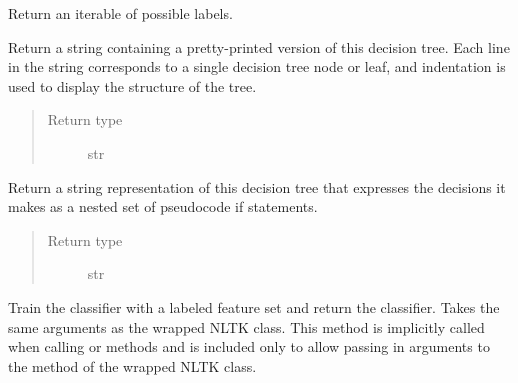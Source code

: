 \documentclass[letterpaper,10pt,english]{sphinxmanual}
\begin{document}
\begin{fulllineitems}
\begin{fulllineitems}
\label{api_reference:textblob.classifiers.DecisionTreeClassifier.labels}
Return an iterable of possible labels.

\end{fulllineitems}


\begin{fulllineitems}
\label{api_reference:textblob.classifiers.DecisionTreeClassifier.pprint}
Return a string containing a pretty-printed version of this decision
tree. Each line in the string corresponds to a single decision tree node
or leaf, and indentation is used to display the structure of the tree.
\begin{quote}\begin{description}
\item[{Return type}] \leavevmode
str

\end{description}\end{quote}

\end{fulllineitems}


\begin{fulllineitems}
\label{api_reference:textblob.classifiers.DecisionTreeClassifier.pseudocode}
Return a string representation of this decision tree that expresses
the decisions it makes as a nested set of pseudocode if statements.
\begin{quote}\begin{description}
\item[{Return type}] \leavevmode
str

\end{description}\end{quote}

\end{fulllineitems}


\begin{fulllineitems}
\label{api_reference:textblob.classifiers.DecisionTreeClassifier.train}
Train the classifier with a labeled feature set and return
the classifier. Takes the same arguments as the wrapped NLTK class.
This method is implicitly called when calling  or
 methods and is included only to allow passing in arguments
to the  method of the wrapped NLTK class.


\end{fulllineitems}
\end{fulllineitems}
\end{document}
